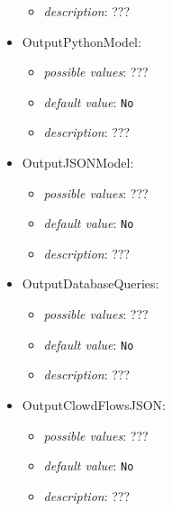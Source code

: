 \documentclass{article}
\begin{document}
\begin{itemize}
\begin{itemize}
                \item \emph{description}: ???
           \end{itemize}
    \item OutputPythonModel:
           \begin{itemize}
                \item \emph{possible values}: ???
                \item \emph{default value}: \texttt{No}
                \item \emph{description}: ???
           \end{itemize}
    \item OutputJSONModel:
           \begin{itemize}
                \item \emph{possible values}: ???
                \item \emph{default value}: \texttt{No}
                \item \emph{description}: ???
           \end{itemize}
    \item OutputDatabaseQueries:
           \begin{itemize}
                \item \emph{possible values}: ???
                \item \emph{default value}: \texttt{No}
                \item \emph{description}: ???
           \end{itemize}
    \item OutputClowdFlowsJSON:
           \begin{itemize}
                \item \emph{possible values}: ???
                \item \emph{default value}: \texttt{No}
                \item \emph{description}: ???
           \end{itemize}
\end{itemize}
\end{document}
